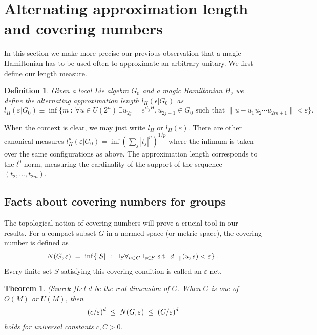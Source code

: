 \documentclass[12pt, a4-paper]{amsart}
\numberwithin{equation}{section}
\newcommand{\kl}{\pl \le \pl}
\newcommand{\lel}{\pl = \pl}
\newcommand{\pl}{\hspace{.1cm}}
\newcommand{\eps}{\varepsilon}
\newtheorem{theorem}[lemma]{Theorem}
\newtheorem{defi}[lemma]{Definition}
\begin{document}
\section{Alternating approximation length and covering numbers}\label{sec:approx_length}
In this section we make more precise our previous observation that a magic Hamiltonian has to be used often to approximate an arbitrary unitary. We first define our length measure.
\begin{defi}\label{def:alt_approx_length}
    Given a local Lie algebra $G_0$ and a magic Hamiltonian $H$, we define the alternating approximation length $l_H(\epsilon|G_0)$ as
    \begin{equation}
        l_H(\eps|G_0)\equiv\inf\{m ~:~ \forall u \in U(2^n) ~\exists u_{2j}=e^{it_jH} , u_{2j+1}\in G_0 \mbox{ such that } \|u-u_1u_2\cdots u_{2m+1}\|<\eps  \}.
    \end{equation}
\end{defi}
When the context is clear, we may just write $l_H$ or $l_H(\eps)$. There are other canonical measures $l_H^p(\eps|G_0)=\inf (\sum_j |t_j|^p)^{1/p}$ where the infimum is taken over the same configurations as above. The approximation length corresponds to the $l^0$-norm, measuring the cardinality of the support of the sequence $(t_2,...,t_{2m})$. 

\subsection{Facts about covering numbers for groups}

The topological notion of covering numbers will prove a crucial tool in our results. For a compact subset $G$ in a normed space (or metric space), the covering number is defined as    
  \[ N(G,\eps) \lel \inf\{|S| ~:~ \exists_{S} \forall_{u\in G} \exists_{s\in S}  \text{ s.t. }d_{\|\pl \|}(u,s)<\eps\} \pl .\] 
Every finite set $S$ satisfying  this covering condition is called an  $\eps$-net. 

\begin{theorem}(Szarek \cite{Szarek1998MetricSpaces})\label{Szarek}  Let $d$ be the real dimension of $G$. When $G$ is one of $O(M)$ or $U(M)$, then 
  \[   (c/\eps)^d \kl N(G,\eps) \kl (C/\eps)^d \] 
 holds for universal constants $c,C>0$.  
 \end{theorem}    
\end{document}
